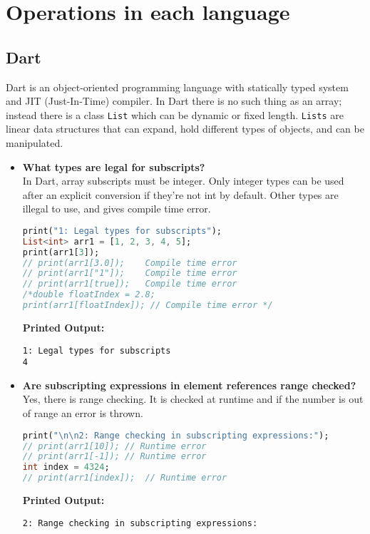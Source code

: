 \documentclass{article}
\begin{document}

\section{Operations in each language}


\subsection{Dart}
Dart is an object-oriented programming language with statically typed system and JIT (Just-In-Time) compiler. In Dart there is no such thing as an array; instead there is a class \texttt{List} which can be dynamic or fixed length. \texttt{Lists} are linear data structures that can expand, hold different types of objects, and can be manipulated. 

\begin{itemize}
\item \textbf{What types are legal for subscripts?} \\
 In Dart, array subscripts must be integer. Only integer types can be used after an explicit conversion if they’re not int by default. Other types are illegal to use, and gives compile time error. 
\begin{lstlisting}[language=Dart]
print("1: Legal types for subscripts");
List<int> arr1 = [1, 2, 3, 4, 5];
print(arr1[3]);
// print(arr1[3.0]);    Compile time error
// print(arr1["1"]);    Compile time error
// print(arr1[true]);   Compile time error         
/*double floatIndex = 2.8;
print(arr1[floatIndex]); // Compile time error */
\end{lstlisting}
\textbf{Printed Output:}
\begin{verbatim}
1: Legal types for subscripts
4
\end{verbatim}
    
    
\item \textbf{Are subscripting expressions in element references range checked?} \\
Yes, there is range checking. It is checked at runtime and if the number is out of range an error is thrown. 
\begin{lstlisting}[language=Dart]
print("\n\n2: Range checking in subscripting expressions:");
// print(arr1[10]); // Runtime error 
// print(arr1[-1]); // Runtime error
int index = 4324;
// print(arr1[index]);  // Runtime error 
\end{lstlisting}
\textbf{Printed Output:}
\begin{verbatim}
2: Range checking in subscripting expressions:
\end{verbatim}


\end{itemize}
\end{document}
